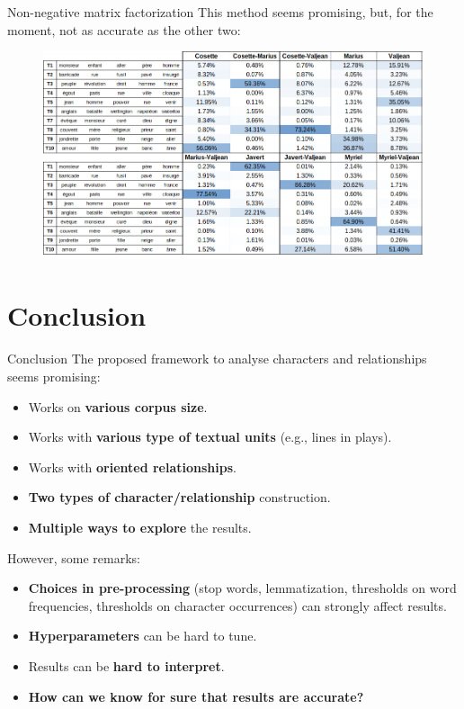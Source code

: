\documentclass[10pt]{beamer}
\newcommand{\imp}[1]{\textbf{\color{cyan}#1}}
\begin{document}
	\begin{frame}{Non-negative matrix factorization}
		This method seems promising, but, for the moment, not as accurate as the other two:
		\begin{figure}
			\centering
			\includegraphics[width=\textwidth]{img/nmf.png}
		\end{figure}		
	\end{frame}
	
	
	\section[Conclusion]{Conclusion}
	
	
	\begin{frame}{Conclusion}
		The proposed framework to analyse characters and relationships seems promising:
		\begin{itemize}
			\item Works on \imp{various corpus size}.
			\item Works with \imp{various type of textual units} (e.g., lines in plays).
			\item Works with \imp{oriented relationships}.
			\item \imp{Two types of character/relationship} construction.
			\item \imp{Multiple ways to explore} the results.
		\end{itemize}
		However, some remarks:
		\begin{itemize}
			\item \imp{Choices in pre-processing} (stop words, lemmatization, thresholds on word frequencies, thresholds on character occurrences) can strongly affect results.
			\item \imp{Hyperparameters} can be hard to tune.
			\item Results can be \imp{hard to interpret}.
			\item \imp{How can we know for sure that results are accurate?}
		\end{itemize}
	\end{frame}
	
\end{document}
